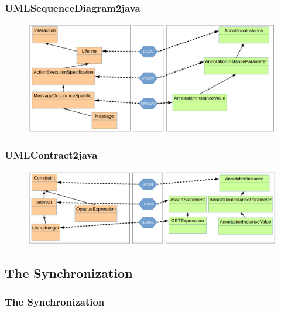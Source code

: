 \documentclass{beamer}
\begin{document}
\begin{frame}
	\frametitle{UMLSequenceDiagram2java}
	\begin{figure}
		\includegraphics[width=.8\textwidth]{umlSequenceDiagram2java_type}
	\end{figure}
\end{frame}

\begin{frame}
	\frametitle{UMLContract2java}
	\begin{figure}
		\includegraphics[width=.8\textwidth]{umlContract2java_type}
	\end{figure}
\end{frame}

\subsection{The Synchronization}
\begin{frame}
	\frametitle{The Synchronization}
\end{frame}
\end{document}
